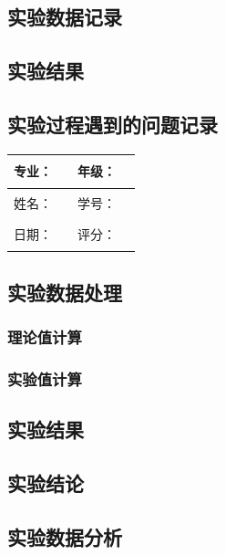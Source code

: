 \documentclass[dvipsnames, svgnames,a4paper,11pt]{article}
\newcommand{\recordblank}[1]{\par\vspace*{#1}\par}
\begin{document}
\subsection{实验数据记录}
\recordblank{7.0cm}
\subsection{实验结果}
\recordblank{7.0cm}
\subsection{实验过程遇到的问题记录}
\recordblank{5.0cm}
\clearpage
\noindent\begin{minipage}{\textwidth}
	\renewcommand\arraystretch{1.7}
	\begin{tabularx}{\textwidth}{|X|X|X|X|}
	\hline
	专业：& \rule{2.5cm}{0.4pt} & 年级：& \rule{2.5cm}{0.4pt}\\
	\hline
	姓名：& \rule{2.5cm}{0.4pt} & 学号：& \rule{2.5cm}{0.4pt}\\
	\hline
	日期：& \rule{2.5cm}{0.4pt} & 评分：& \rule{2.5cm}{0.4pt}\\
	\hline
	\end{tabularx}
\vspace{0.8em}
\subsection{实验数据处理}
\subsubsection{理论值计算}
\recordblank{3.5cm}
\end{minipage}

\subsubsection{实验值计算}
\recordblank{3.5cm}
\subsection{实验结果}
\recordblank{3.5cm}
\subsection{实验结论}
\recordblank{3.5cm}
\subsection{实验数据分析}
\end{document}
